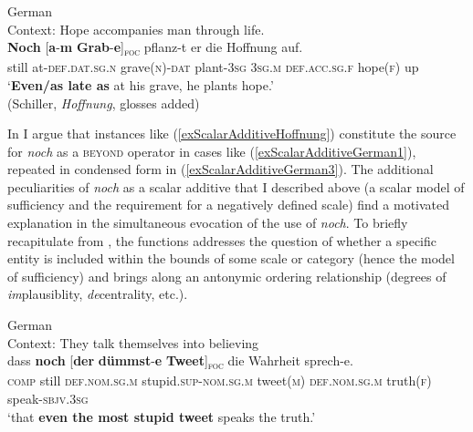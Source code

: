 {\begin{exe}
	\ex German\label{exScalarAdditiveHoffnung}\\
	Context: Hope accompanies man through life.\\
	\gll \textbf{Noch} \textup{[}\textbf{a}-\textbf{m} \textbf{Grab}-\textbf{e}\textup{]\textsubscript{\textsc{foc}}} pflanz-t er die Hoffnung auf.\\
	still \phantom{[}at-\textsc{def}.\textsc{dat}.\textsc{sg}.\textsc{n} grave(\textsc{n})-\textsc{dat} plant-3\textsc{sg} 3\textsc{sg}.\textsc{m} \textsc{def}.\textsc{acc}.\textsc{sg}.\textsc{f} hope(\textsc{f}) up\\
	\glt \lq{}\textbf{Even/as late as} at his grave, he plants hope.\rq{}
	\\(Schiller, \textit{Hoffnung}, glosses added)
\end{exe}

In \textcite{PersohnSchonNoch} I argue that instances like (\ref{exScalarAdditiveHoffnung}) constitute the source for \textit{noch} as a \textsc{beyond} operator in cases like  (\ref{exScalarAdditiveGerman1}), repeated in condensed form in (\ref{exScalarAdditiveGerman3}). The additional peculiarities of \textit{noch} as a scalar additive that I described above (a scalar model of sufficiency and the requirement for a negatively defined scale) find a motivated explanation in the simultaneous evocation of the  use of \textit{noch}. To briefly recapitulate from , the  functions addresses the question of whether a specific entity is included within the bounds of some scale or category (hence the model of sufficiency) and brings along an antonymic ordering relationship (degrees of \textit{im}plausiblity, \textit{de}centrality, etc.).

\begin{exe}
	\ex German\label{exScalarAdditiveGerman3}\\
	Context: They talk themselves into believing\\
	\gll dass \textbf{noch} \textup{[}\textbf{der} \textbf{dümmst}-\textbf{e} \textbf{Tweet}\textup{]\textsubscript{\textsc{foc}}} die Wahrheit sprech-e.\\
\textsc{comp} still \phantom{[}\textsc{def}.\textsc{nom}.\textsc{sg}.\textsc{m} stupid.\textsc{sup}-\textsc{nom}.\textsc{sg}.\textsc{m} tweet(\textsc{m}) \textsc{def}.\textsc{nom}.\textsc{sg}.\textsc{m} truth(\textsc{f}) speak-\textsc{sbjv}.3\textsc{sg}\\
\glt \lq that \textbf{even the most stupid tweet} speaks the truth.'
\end{exe}

}
